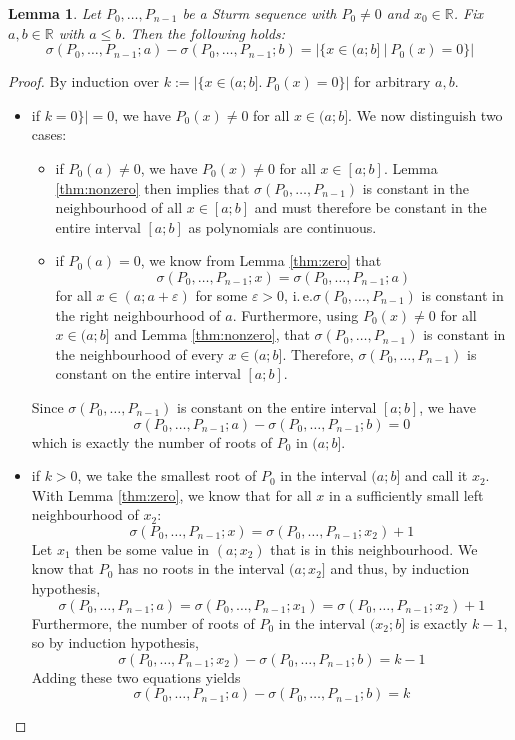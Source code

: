 \documentclass[11pt,a4paper,oneside]{article}
\newtheorem{lemma}[definition]{Lemma}
\newcommand{\RR}{\mathbb{R}}
\renewcommand{\epsilon}{\varepsilon}
\newcommand{\ie}{i.\,e.\xspace}
\begin{document}
\label{thm:count_roots_between}
\begin{lemma}
Let $P_0,\ldots,P_{n-1}$ be a Sturm sequence with $P_0\neq 0$ and $x_0\in\RR$. Fix $a,b\in\RR$ with $a \leq b$. Then the following holds:
$$\sigma(P_0,\ldots,P_{n-1}; a)-\sigma(P_0,\ldots,P_{n-1}; b) = |\{x\in (a;b]\ |\ P_0(x)=0\}|$$
\end{lemma}
\begin{proof}
By induction over $k:=|\{x\in (a;b].\ P_0(x)=0\}|$ for arbitrary $a, b$.
\begin{itemize}
\item if $k=0\}|=0$, we have $P_0(x)\neq 0$ for all $x\in (a;b]$. We now distinguish two cases:
\begin{itemize}
\item if $P_0(a)\neq 0$, we have $P_0(x)\neq 0$ for all $x\in[a;b]$. Lemma \ref{thm:nonzero} then implies that $\sigma(P_0,\ldots,P_{n-1})$ is constant in the neighbourhood of all $x\in[a;b]$ and must therefore be constant in the entire interval $[a;b]$ as polynomials are continuous.
\item if $P_0(a)=0$, we know from Lemma \ref{thm:zero} that $$\sigma(P_0,\ldots,P_{n-1}; x)=\sigma(P_0,\ldots,P_{n-1}; a)$$ for all $x\in(a;a+\epsilon)$ for some $\epsilon > 0$, \ie $\sigma(P_0,\ldots,P_{n-1})$ is constant in the right neighbourhood of $a$. Furthermore, using $P_0(x)\neq 0$ for all $x\in(a;b]$ and Lemma \ref{thm:nonzero}, that $\sigma(P_0,\ldots,P_{n-1})$ is constant in the neighbourhood of every $x\in(a;b]$. Therefore, $\sigma(P_0,\ldots,P_{n-1})$ is constant on the entire interval $[a;b]$.
\end{itemize}
Since $\sigma(P_0,\ldots,P_{n-1})$ is constant on the entire interval $[a;b]$, we have $$\sigma(P_0,\ldots,P_{n-1}; a)-\sigma(P_0,\ldots,P_{n-1}; b) = 0$$ which is exactly the number of roots of $P_0$ in $(a;b]$.

\item if $k>0$, we take the smallest root of $P_0$ in the interval $(a;b]$ and call it $x_2$. With Lemma \ref{thm:zero}, we know that for all $x$ in a sufficiently small left neighbourhood of $x_2$: $$\sigma(P_0,\ldots,P_{n-1};x) = \sigma(P_0,\ldots,P_{n-1};x_2)+1$$  Let $x_1$ then be some value in $(a;x_2)$ that is in this neighbourhood. We know that $P_0$ has no roots in the interval $(a;x_2]$ and thus, by induction hypothesis, $$\sigma(P_0,\ldots,P_{n-1};a)=\sigma(P_0,\ldots,P_{n-1};x_1)=\sigma(P_0,\ldots,P_{n-1};x_2)+1$$ Furthermore, the number of roots of $P_0$ in the interval $(x_2;b]$ is exactly $k-1$, so by induction hypothesis, $$\sigma(P_0,\ldots,P_{n-1};x_2)-\sigma(P_0,\ldots,P_{n-1};b) = k-1$$ Adding these two equations yields $$\sigma(P_0,\ldots,P_{n-1};a)-\sigma(P_0,\ldots,P_{n-1};b) = k$$
\end{itemize}
\end{proof}
\end{document}
